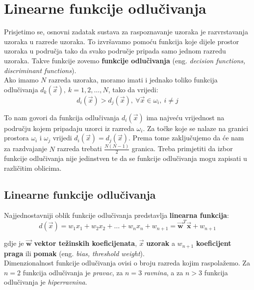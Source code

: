 \documentclass{book}
\begin{document}
\chapter{Linearne funkcije odlučivanja}

Prisjetimo se, osnovni zadatak sustava za raspoznavanje  uzoraka je
razvrstavanja uzoraka u razrede uzoraka.  To izvršavamo pomoću funkcija  koje
dijele prostor uzoraka u područja tako da svako područje pripada samo jednom
razredu uzoraka.  Takve funkcije zovemo \textbf{funkcije odlučivanja} (eng.
\textit{decision functions, discriminant functions}). \\

Ako imamo $N$ razreda uzoraka, moramo imati i jednako toliko funkcija
odlučivanja $d_k(\vec{x}), \ k=1,2,\ldots,N$, tako da vrijedi:
$$ d_i(\vec{x}) > d_j(\vec{x}), \ \forall\vec{x} \in \omega_i, \ i \neq j $$

To nam govori da funkcija odlučivanja $d_i(\vec{x})$ ima najveću vrijednost na
području kojem pripadaju uzorci iz razreda $\omega_i$. Za točke koje se nalaze
na granici prostora $\omega_i$ i $\omega_j$ vrijedi $d_i(\vec{x}) =
d_j(\vec{x})$. Prema tome zaključujemo da će nam za razdvajanje $N$ razreda
trebati $\frac{N(N-1)}{2}$ granica. Treba primjetiti da izbor funkcije
odlučivanja nije jedinstven te da se funkcije odlučivanja mogu zapisati u
različitim oblicima.

\section{Linearne funkcije odlučivanja}

Najjednostavniji oblik funkcije odlučivanja predstavlja \textbf{linearna funkcija}:
$$ d(\vec{x}) = w_1x_1 + w_2x_2 + \ldots + w_nx_n + w_{n+1}
= \vec{\mathbf{w}}^T\vec{\mathbf{x}} + w_{n+1} $$

 gdje je
$\vec{\mathbf{w}}$ \textbf{vektor težinskih koeficijenata},   $\vec{x}$
\textbf{uzorak} a $w_{n+1}$ \textbf{koeficijent praga}   ili
\textbf{pomak} (eng. \textit{bias, threshold weight}). \\

Dimenzionalnost funkcije odlučivanja ovisi o broju razreda kojim
raspolažemo. Za $n=2$ funkcija odlučivanja  je \textit{pravac}, za $n=3$
\textit{ravnina}, a za $n > 3$ funkcija odlučivanja je \textit{hiperravnina}. \\
\end{document}
